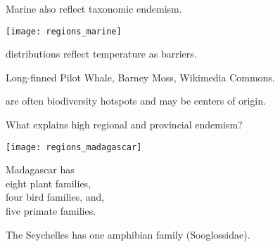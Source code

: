 \documentclass[t]{beamer}
\begin{document}
\begin{frame}[t,plain]{Marine  also reflect taxonomic endemism.}

		\texttt{[image: regions\_marine]}

\end{frame}

{
\begin{frame}[b,plain]{ distributions reflect temperature as barriers.}

\tiny\hfill Long-finned Pilot Whale, Barney Moss, Wikimedia Commons.
\end{frame}
}

{
\begin{frame}[b,plain]{ are often biodiversity hotspots and may be centers of origin.}

\end{frame}
}

{
\begin{frame}[b,plain]

\end{frame}
}

{
\begin{frame}[b,plain]

\end{frame}
}

\begin{frame}[t,plain]{What explains high regional and provincial endemism?}
\begin{multicols}{2}

	\texttt{[image: regions\_madagascar]}

	\columnbreak

	\noindent Madagascar has\\ \quad eight plant families, \\ \quad four bird families, and,\\ \quad five primate families.
	
	\vspace{\baselineskip}
	
	\noindent The Seychelles has one amphibian family (Sooglossidae).
	
	\vspace{\baselineskip}
	
\end{multicols}

\end{frame}
\end{document}
